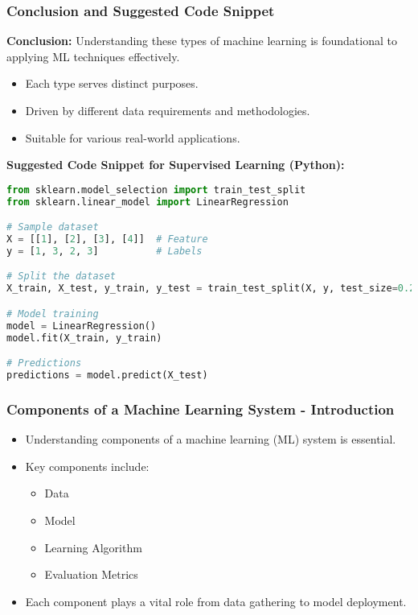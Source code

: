 \documentclass[aspectratio=169]{beamer}
\begin{document}
\begin{frame}[fragile]
    \frametitle{Conclusion and Suggested Code Snippet}
    \textbf{Conclusion:} 
    Understanding these types of machine learning is foundational to applying ML techniques effectively.

    \begin{itemize}
        \item Each type serves distinct purposes.
        \item Driven by different data requirements and methodologies.
        \item Suitable for various real-world applications.
    \end{itemize}

    \textbf{Suggested Code Snippet for Supervised Learning (Python):}
    \begin{lstlisting}[language=Python]
from sklearn.model_selection import train_test_split
from sklearn.linear_model import LinearRegression

# Sample dataset
X = [[1], [2], [3], [4]]  # Feature
y = [1, 3, 2, 3]          # Labels

# Split the dataset
X_train, X_test, y_train, y_test = train_test_split(X, y, test_size=0.2)

# Model training
model = LinearRegression()
model.fit(X_train, y_train)

# Predictions
predictions = model.predict(X_test)
    \end{lstlisting}
\end{frame}

\begin{frame}[fragile]
    \frametitle{Components of a Machine Learning System - Introduction}
    \begin{itemize}
        \item Understanding components of a machine learning (ML) system is essential.
        \item Key components include:
        \begin{itemize}
            \item Data
            \item Model 
            \item Learning Algorithm
            \item Evaluation Metrics
        \end{itemize}
        \item Each component plays a vital role from data gathering to model deployment.
    \end{itemize}
\end{frame}
\end{document}

